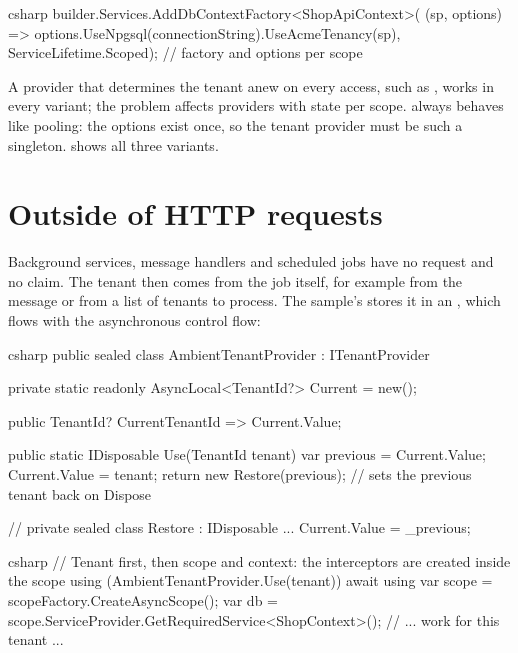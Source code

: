 \begin{sourcecode}{csharp}
builder.Services.AddDbContextFactory<ShopApiContext>(
    (sp, options) => options.UseNpgsql(connectionString).UseAcmeTenancy(sp),
    ServiceLifetime.Scoped);         // factory and options per scope
\end{sourcecode}

A provider that determines the tenant anew on every access, such as
, works in every variant; the problem
affects providers with state per scope.
 always
behaves like pooling: the options exist once, so the tenant provider must be such a
singleton.  shows all
three variants.

\section{Outside of HTTP requests}

Background services, message handlers and scheduled jobs have no request and no claim. The
tenant then comes from the job itself, for example from the message or from a list of
tenants to process. The sample's 
stores it in an , which flows with the asynchronous control
flow:

\begin{sourcecode}{csharp}
public sealed class AmbientTenantProvider : ITenantProvider
{
    private static readonly AsyncLocal<TenantId?> Current = new();

    public TenantId? CurrentTenantId => Current.Value;

    public static IDisposable Use(TenantId tenant)
    {
        var previous = Current.Value;
        Current.Value = tenant;
        return new Restore(previous);     // sets the previous tenant back on Dispose
    }

    // private sealed class Restore : IDisposable { ... Current.Value = _previous; }
}
\end{sourcecode}

\begin{sourcecode}{csharp}
// Tenant first, then scope and context: the interceptors are created inside the scope
using (AmbientTenantProvider.Use(tenant))
{
    await using var scope = scopeFactory.CreateAsyncScope();
    var db = scope.ServiceProvider.GetRequiredService<ShopContext>();
    // ... work for this tenant ...
}
\end{sourcecode}

